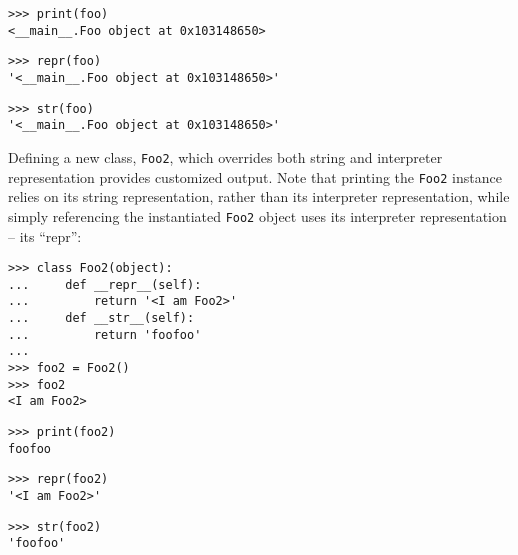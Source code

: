 \begin{comment}
<abjad>
print(foo)
repr(foo)
str(foo)
</abjad>
\end{comment}

\begin{abjadbookoutput}
\begin{singlespacing}
\vspace{-0.5\baselineskip}
\begin{lstlisting}
>>> print(foo)
<__main__.Foo object at 0x103148650>
\end{lstlisting}
\begin{lstlisting}
>>> repr(foo)
'<__main__.Foo object at 0x103148650>'
\end{lstlisting}
\begin{lstlisting}
>>> str(foo)
'<__main__.Foo object at 0x103148650>'
\end{lstlisting}
\end{singlespacing}
\end{abjadbookoutput}

\noindent Defining a new class, \texttt{Foo2}, which overrides both string and
interpreter representation provides customized output. Note that printing the
\texttt{Foo2} instance relies on its string representation, rather than its
interpreter representation, while simply referencing the instantiated
\texttt{Foo2} object uses its interpreter representation -- its \enquote{repr}:

\begin{comment}
<abjad>
class Foo2(object):
    def __repr__(self):
        return '<I am Foo2>'
    def __str__(self):
        return 'foofoo'

foo2 = Foo2()
foo2
print(foo2)
repr(foo2)
str(foo2)
</abjad>
\end{comment}

\begin{abjadbookoutput}
\begin{singlespacing}
\vspace{-0.5\baselineskip}
\begin{lstlisting}
>>> class Foo2(object):
...     def __repr__(self):
...         return '<I am Foo2>'
...     def __str__(self):
...         return 'foofoo'
...
>>> foo2 = Foo2()
>>> foo2
<I am Foo2>
\end{lstlisting}
\begin{lstlisting}
>>> print(foo2)
foofoo
\end{lstlisting}
\begin{lstlisting}
>>> repr(foo2)
'<I am Foo2>'
\end{lstlisting}
\begin{lstlisting}
>>> str(foo2)
'foofoo'
\end{lstlisting}
\end{singlespacing}
\end{abjadbookoutput}

